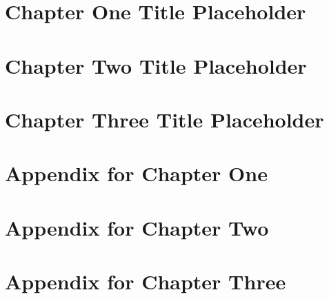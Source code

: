 \documentclass[12pt,oneside,openany]{report}
\numberwithin{figure}{chapter}
\numberwithin{table}{chapter}
\begin{document}
\chapter{Chapter One Title Placeholder}


\chapter{Chapter Two Title Placeholder}


\chapter{Chapter Three Title Placeholder}


\appendix

\chapter{Appendix for Chapter One}


\chapter{Appendix for Chapter Two}


\chapter{Appendix for Chapter Three}


\clearpage
\singlespacing
{}

\end{document}

